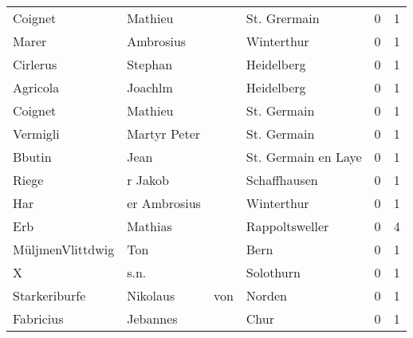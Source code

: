 \begin{center}
\begin{tiny}
\begin{longtabu}{llllrr}
                  Coignet &                            Mathieu &             &                                St. Grermain &          0 &         1 \\
                    Marer &                          Ambrosius &             &                                  Winterthur &          0 &         1 \\
                 Cirlerus &                            Stephan &             &                                  Heidelberg &          0 &         1 \\
                 Agricola &                            Joachlm &             &                                  Heidelberg &          0 &         1 \\
                  Coignet &                            Mathieu &             &                                 St. Germain &          0 &         1 \\
                 Vermigli &                       Martyr Peter &             &                                 St. Germain &          0 &         1 \\
                   Bbutin &                               Jean &             &                         St. Germain en Laye &          0 &         1 \\
                    Riege &                            r Jakob &             &                                Schaffhausen &          0 &         1 \\
                      Har &                       er Ambrosius &             &                                  Winterthur &          0 &         1 \\
                      Erb &                            Mathias &             &                              Rappoltsweller &          0 &         4 \\
         MüljmenVlittdwig &                                Ton &             &                                        Bern &          0 &         1 \\
                        X &                               s.n. &             &                                   Solothurn &          0 &         1 \\
            Starkeriburfe &                           Nikolaus &         von &                                      Norden &          0 &         1 \\
                Fabricius &                           Jebannes &             &                                        Chur &          0 &         1 \\

\end{longtabu}
\end{tiny}
\end{center}
